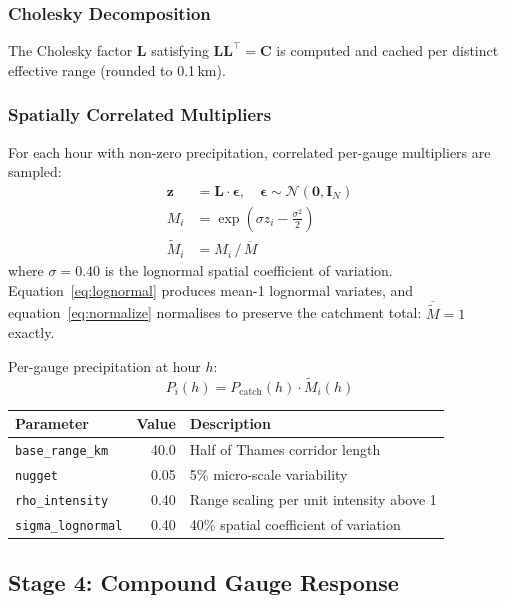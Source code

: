 \documentclass[11pt,a4paper]{article}
\begin{document}
\subsubsection{Cholesky Decomposition}

The Cholesky factor $\mathbf{L}$ satisfying $\mathbf{L}\mathbf{L}^\top = \mathbf{C}$
is computed and cached per distinct effective range (rounded to 0.1\,km).

\subsubsection{Spatially Correlated Multipliers}

For each hour with non-zero precipitation, correlated per-gauge multipliers
are sampled:
\begin{align}
\mathbf{z} &= \mathbf{L} \cdot \boldsymbol{\epsilon}, \quad
    \boldsymbol{\epsilon} \sim \mathcal{N}(\mathbf{0}, \mathbf{I}_N)
    \label{eq:corr_normals} \\
M_i &= \exp\!\left(\sigma z_i - \tfrac{\sigma^2}{2}\right)
    \label{eq:lognormal} \\
\tilde{M}_i &= M_i \,/\, \overline{M}
    \label{eq:normalize}
\end{align}
where $\sigma = 0.40$ is the lognormal spatial coefficient of variation.
Equation~\eqref{eq:lognormal} produces mean-1 lognormal variates, and
equation~\eqref{eq:normalize} normalises to preserve the catchment total:
$\overline{\tilde{M}} = 1$ exactly.

Per-gauge precipitation at hour $h$:
\[
P_i(h) = P_{\text{catch}}(h) \cdot \tilde{M}_i(h)
\]

\begin{center}
\begin{tabular}{lrl}
\toprule
\textbf{Parameter} & \textbf{Value} & \textbf{Description} \\
\midrule
\texttt{base\_range\_km} & 40.0 & Half of Thames corridor length \\
\texttt{nugget} & 0.05 & 5\% micro-scale variability \\
\texttt{rho\_intensity} & 0.40 & Range scaling per unit intensity above 1 \\
\texttt{sigma\_lognormal} & 0.40 & 40\% spatial coefficient of variation \\
\bottomrule
\end{tabular}
\end{center}

\subsection{Stage 4: Compound Gauge Response}
\label{sec:compound}
\end{document}
